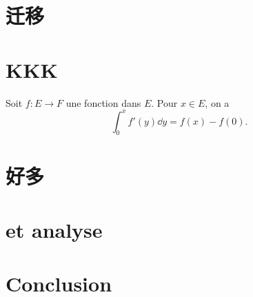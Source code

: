 \documentclass[a4paper, 11pt,twoside=true]{scrartcl} %
\begin{document}

\maketitle

\tableofcontents %
\newpage


\section{迁移}
\lipsum[7]
\section{KKK}
Soit $f:E\to F$ une fonction  dans $E$. Pour $x\in E$, on a
\[
\int_0^x f'(y)\dd{y}=f(x)-f(0).
\]

\lipsum[19]
\section{好多}
\lipsum[20]
\section{ et analyse}
\lipsum[30]
\section{Conclusion}
\lipsum[20]
\end{document}
